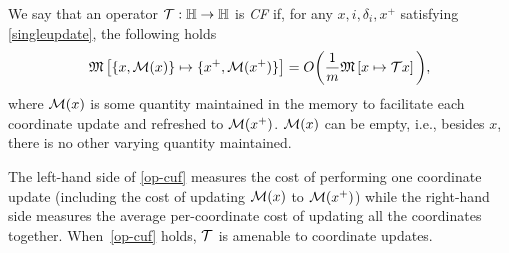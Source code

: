 \begin{definition}[CF operator]
 We say that an operator ${\mathcal{T}}:\mathbb{H}\to\mathbb{H}$ is \emph{CF} if, for any $x,i,\delta_i,x^+$ satisfying \eqref{singleupdate}, the following holds
\begin{equation}\label{op-cuf} \nops{\{x,\cM(x)\}}{\{x^+,\cM(x^+)\}}= O\bigg(\frac{1}{m}\nops{x}{\cT x}\bigg),
\end{equation}
where ${\mathcal{M}}(x)$ is some quantity maintained in the memory to facilitate each coordinate update and refreshed to ${\mathcal{M}}(x^+)$. ${\mathcal{M}}(x)$ can be empty, i.e., besides $x$, there is no other varying quantity maintained.
\end{definition}


The left-hand side of \eqref{op-cuf} measures the cost of performing one coordinate update (including the cost of updating ${\mathcal{M}}(x)$ to ${\mathcal{M}}(x^+)$)  while the right-hand side measures the average per-coordinate cost of updating all the coordinates together. When~\eqref{op-cuf} holds, ${\mathcal{T}}$ is amenable to coordinate updates.

